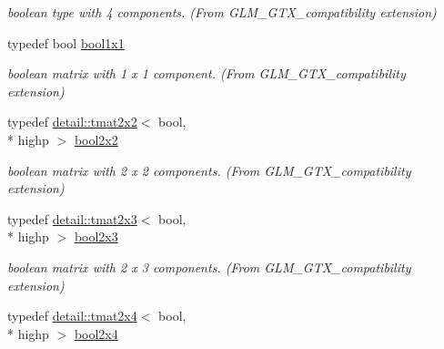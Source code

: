 \begin{DoxyCompactItemize}
\begin{DoxyCompactList}\small\item\em boolean type with 4 components. (From G\-L\-M\-\_\-\-G\-T\-X\-\_\-compatibility extension) \end{DoxyCompactList}\item 
\hypertarget{group__gtx__compatibility_ga98d9d3da22aebc872ba38ce5afa0eff7}{typedef bool \hyperlink{group__gtx__compatibility_ga98d9d3da22aebc872ba38ce5afa0eff7}{bool1x1}}\label{group__gtx__compatibility_ga98d9d3da22aebc872ba38ce5afa0eff7}

\begin{DoxyCompactList}\small\item\em boolean matrix with 1 x 1 component. (From G\-L\-M\-\_\-\-G\-T\-X\-\_\-compatibility extension) \end{DoxyCompactList}\item 
\hypertarget{group__gtx__compatibility_ga44cd09c0dad9ea163f038a342555867f}{typedef \hyperlink{structglm_1_1detail_1_1tmat2x2}{detail\-::tmat2x2}$<$ bool, \\*
highp $>$ \hyperlink{group__gtx__compatibility_ga44cd09c0dad9ea163f038a342555867f}{bool2x2}}\label{group__gtx__compatibility_ga44cd09c0dad9ea163f038a342555867f}

\begin{DoxyCompactList}\small\item\em boolean matrix with 2 x 2 components. (From G\-L\-M\-\_\-\-G\-T\-X\-\_\-compatibility extension) \end{DoxyCompactList}\item 
\hypertarget{group__gtx__compatibility_ga75013772bb088d107a1c1a994e7f9b14}{typedef \hyperlink{structglm_1_1detail_1_1tmat2x3}{detail\-::tmat2x3}$<$ bool, \\*
highp $>$ \hyperlink{group__gtx__compatibility_ga75013772bb088d107a1c1a994e7f9b14}{bool2x3}}\label{group__gtx__compatibility_ga75013772bb088d107a1c1a994e7f9b14}

\begin{DoxyCompactList}\small\item\em boolean matrix with 2 x 3 components. (From G\-L\-M\-\_\-\-G\-T\-X\-\_\-compatibility extension) \end{DoxyCompactList}\item 
\hypertarget{group__gtx__compatibility_gaf24096d8a88d274b94002386a3fcab0c}{typedef \hyperlink{structglm_1_1detail_1_1tmat2x4}{detail\-::tmat2x4}$<$ bool, \\*
highp $>$ \hyperlink{group__gtx__compatibility_gaf24096d8a88d274b94002386a3fcab0c}{bool2x4}}\label{group__gtx__compatibility_gaf24096d8a88d274b94002386a3fcab0c}


\end{DoxyCompactItemize}
